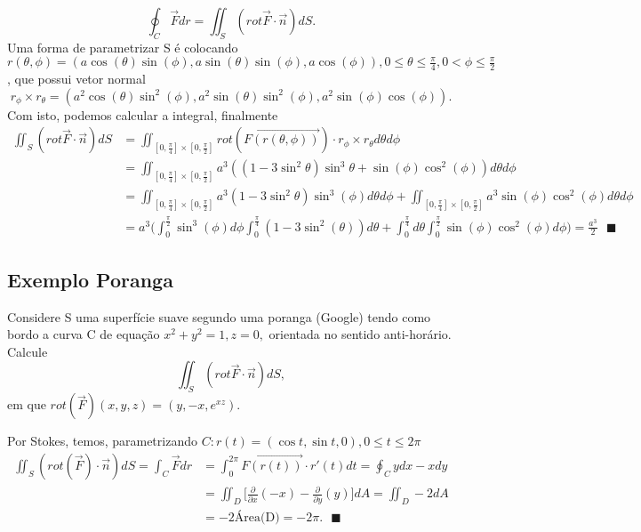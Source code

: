 \documentclass{article}
\renewcommand\qedsymbol{$\blacksquare$}
\begin{document}
  $$
  \oint_{C}\vec{F}dr = \iint_{S}(rot \vec{F}\cdot \vec{n})dS.
  $$
  Uma forma de parametrizar S \'e colocando $r(\theta, \phi) = (a\cos(\theta)\sin(\phi), a\sin(\theta)\sin(\phi), a\cos(\phi)), 0\leq{\theta}\leq{\frac{\pi}{4}},
  0<\phi\leq{\frac{\pi}{2}}$, que possui vetor normal
    $$
      r_{\phi}\times r_{\theta} = (a^{2}\cos(\theta)\sin^{2}(\phi), a^{2}\sin(\theta)\sin^2(\phi), a^2\sin(\phi)\cos(\phi)).
    $$
  Com isto, podemos calcular a integral, finalmente
 \begin{align*}
   \iint_{S}(rot \vec{F}\cdot \vec{n})dS &= \iint_{[0, \frac{\pi}{4}]\times[0, \frac{\pi}{2}]}rot(\vec{F(r(\theta, \phi))})\cdot r_{\phi}\times{r_{\theta}}d \theta d \phi \\
   &=\iint_{[0, \frac{\pi}{4}]\times[0, \frac{\pi}{2}]}a^{3}((1-3\sin^{2}\theta)\sin^{3}\theta + \sin(\phi)\cos^{2}(\phi))d\theta d\phi \\ 
   &=\iint_{[0, \frac{\pi}{4}]\times[0, \frac{\pi}{2}]}a^{3}(1-3\sin^{2}\theta)\sin^3(\phi)d\theta d\phi + \iint_{[0, \frac{\pi}{4}]\times[0, \frac{\pi}{2}]}a^{3}\sin(\phi)\cos^2(\phi)d\theta d\phi \\
   &= a^3\biggl(\int_{0}^{\frac{\pi}{2}}\sin^3(\phi)d\phi \int_{0}^{\frac{\pi}{4}}(1-3\sin^2(\theta))d\theta + \int_{0}^{\frac{\pi}{4}}d\theta \int_{0}^{\frac{\pi}{2}}\sin(\phi)\cos^2(\phi)d\phi\biggr) = \frac{a^3}{2} \text{    \qedsymbol}
 \end{align*}

 \subsection{Exemplo Poranga}
 Considere S uma superf\'icie suave segundo uma poranga (Google) tendo como bordo a curva C de equa\c c\~ao $x^{2} + y^{2} = 1, z = 0,$ 
orientada no sentido anti-hor\'ario. Calcule
  $$
  \iint_{S} (rot\vec{F}\cdot \vec{n})dS,
  $$
em que $rot(\vec{F})(x, y, z) = (y, -x, e^{xz})$.

Por Stokes, temos, parametrizando $C: r(t)=(\cos{t}, \sin{t}, 0), 0\leq{t}\leq{2\pi}$
\begin{align*} 
  \iint_{S}(rot(\vec{F})\cdot \vec{n})dS = \int_{C}^{}\vec{F}dr &= \int_{0}^{2\pi}\vec{F(r(t))}\cdot r'(t)dt = \oint_{C}ydx - xdy \\
                                                                &= \iint_{D}\biggl[\frac{\partial{}}{\partial{x}}(-x) - \frac{\partial{}}{\partial{y}}(y)\biggr]dA =
                                                                \iint_{D}-2dA \\
                                                                &= -2\text{\'Area(D)} = -2\pi. \text{    \qedsymbol}
  \end{align*}
\end{document}
